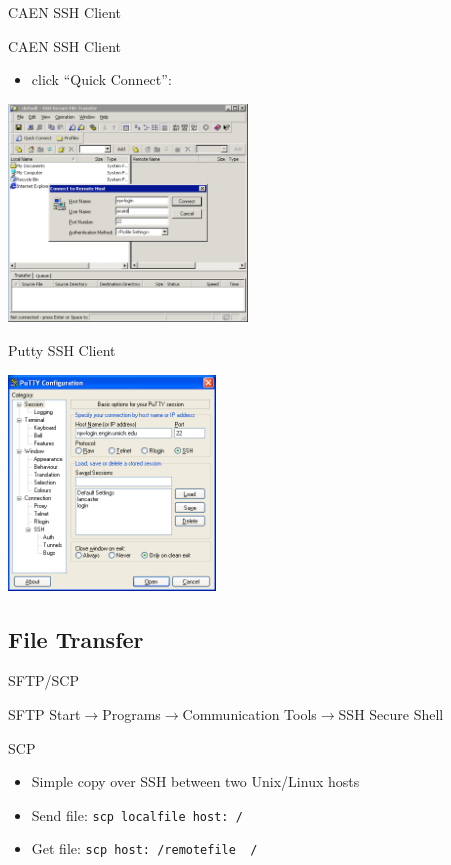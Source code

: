 \documentclass{beamer}
\begin{document}
  \begin{frame}{CAEN SSH Client}
    \begin{block}{CAEN SSH Client}
    \begin{itemize}
      \item click ``Quick Connect'': \\
    \end{itemize}
   \end{block}
      \begin{center}\includegraphics[width=2.5in]{ssh-sftp-login}\end{center}
  \end{frame}

  \begin{frame}{Putty SSH Client}
    \begin{center}\includegraphics[height=2.25in]{ssh-putty-login}\end{center}
  \end{frame}
  
  \subsection {File Transfer}
  \begin{frame}{SFTP/SCP}
    \begin{block}{SFTP}
      Start$\rightarrow$Programs$\rightarrow$Communication Tools$\rightarrow$SSH Secure Shell
    \end{block}
    \begin{block}{SCP}
    \begin{itemize}
      \item Simple copy over SSH between two Unix/Linux hosts
      \item Send file: \texttt{scp localfile host:~/}
      \item Get file: \texttt{scp host:~/remotefile ~/}
    \end{itemize}
    \end{block}
  \end{frame}
\end{document}
